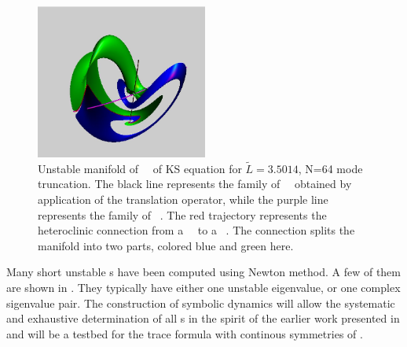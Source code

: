 \begin{figure}[h]\vspace*{-5pt}
\centering
\includegraphics[height=2in]{figs/ks22manifold.ps}
\vspace*{-5pt}\caption{
{\small
	Unstable manifold of ~\eqv\ of KS
equation for $\tilde{L}=3.5014$, N=64 mode truncation.
	The black line represents the family of ~\eqva\ 
obtained by application of the translation operator, 
while the purple line represents the family of ~\eqva.
The red trajectory represents the heteroclinic connection from a ~\eqv\ to  
a \nameit{3}~\eqv.
The connection splits the manifold into two parts, 
colored blue and green here.
        } %
        }
\label{f:KS22Manifold}\vspace*{-5pt}
\end{figure}


Many short unstable \rpo s have been computed using Newton method.
A few of them are shown in \reffig{f:KS22rpo}.
They typically have either one unstable eigenvalue, or one complex
sigenvalue pair.
The construction 
of symbolic dynamics will allow the systematic and exhaustive determination 
of all \rpo s in the spirit of 
the earlier work presented in  and will be a testbed 
for the trace formula with continous symmetries of .

